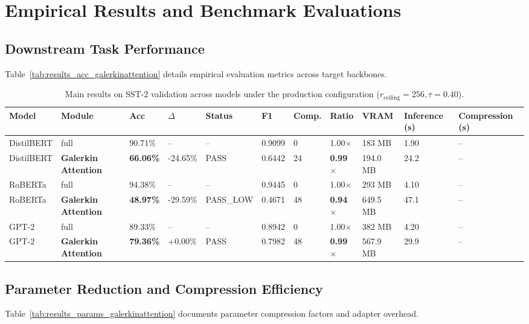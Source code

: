 \section{Empirical Results and Benchmark Evaluations}

\subsection{Downstream Task Performance}
Table~\ref{tab:results_acc_galerkinattention} details empirical evaluation metrics across target backbones.

\begin{table}[t]
\centering
\small
\begin{tabular}{lllllllllll}
\toprule
\textbf{Model} & \textbf{Module} & \textbf{Acc} & \textbf{$\Delta$} & \textbf{Status} & \textbf{F1} & \textbf{Comp.} & \textbf{Ratio} & \textbf{VRAM} & \textbf{Inference (s)} & \textbf{Compression (s)} \\
\midrule
DistilBERT & full & 90.71\% & -- & -- & 0.9099 & 0 & 1.00$\times$ & 183 MB & 1.90 & -- \\
DistilBERT & \textbf{Galerkin Attention} & \textbf{66.06\%} & -24.65\% & PASS & 0.6442 & 24 & \textbf{0.99$\times$} & 194.0 MB & 24.2 & -- \\
RoBERTa & full & 94.38\% & -- & -- & 0.9445 & 0 & 1.00$\times$ & 293 MB & 4.10 & -- \\
RoBERTa & \textbf{Galerkin Attention} & \textbf{48.97\%} & -29.59\% & PASS_LOW & 0.4671 & 48 & \textbf{0.94$\times$} & 649.5 MB & 47.1 & -- \\
GPT-2 & full & 89.33\% & -- & -- & 0.8942 & 0 & 1.00$\times$ & 382 MB & 4.20 & -- \\
GPT-2 & \textbf{Galerkin Attention} & \textbf{79.36\%} & +0.00\% & PASS & 0.7982 & 48 & \textbf{0.99$\times$} & 567.9 MB & 29.9 & -- \\
\bottomrule
\end{tabular}
\caption{Main results on SST-2 validation across models under the production configuration ($r_{\mathrm{ceiling}}=256, \tau=0.40$).}
\label{tab:main_sst2}
\end{table}

\subsection{Parameter Reduction and Compression Efficiency}
Table~\ref{tab:results_params_galerkinattention} documents parameter compression factors and adapter overhead.

